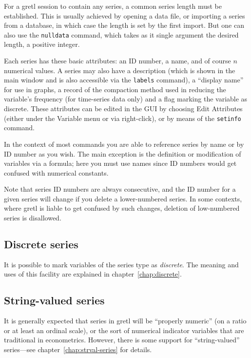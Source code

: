 For a gretl session to contain any series, a common series length must
be established. This is usually achieved by opening a data file, or
importing a series from a database, in which case the length is set by
the first import. But one can also use the \texttt{nulldata} command,
which takes as it single argument the desired length, a positive
integer.

Each series has these basic attributes: an ID number, a name, and of
course $n$ numerical values. A series may also have a description
(which is shown in the main window and is also accessible via the
\texttt{labels} command), a ``display name'' for use in graphs, a
record of the compaction method used in reducing the variable's
frequency (for time-series data only) and a flag marking the variable
as discrete. These attributes can be edited in the GUI by choosing
\textsf{Edit Attributes} (either under the \textsf{Variable} menu or
via right-click), or by means of the \texttt{setinfo} command.

In the context of most commands you are able to reference series by
name or by ID number as you wish. The main exception is the definition
or modification of variables via a formula; here you must use names
since ID numbers would get confused with numerical constants.

Note that series ID numbers are always consecutive, and the ID number
for a given series will change if you delete a lower-numbered series.
In some contexts, where gretl is liable to get confused by such
changes, deletion of low-numbered series is disallowed.

\subsection{Discrete series}

It is possible to mark variables of the series type as
\textit{discrete}. The meaning and uses of this facility are explained
in chapter~\ref{chap:discrete}.

\subsection{String-valued series}

It is generally expected that series in gretl will be ``properly
numeric'' (on a ratio or at least an ordinal scale), or the sort of
numerical indicator variables that are traditional in
econometrics. However, there is some support for ``string-valued''
series---see chapter~\ref{chap:strval-series} for details.

